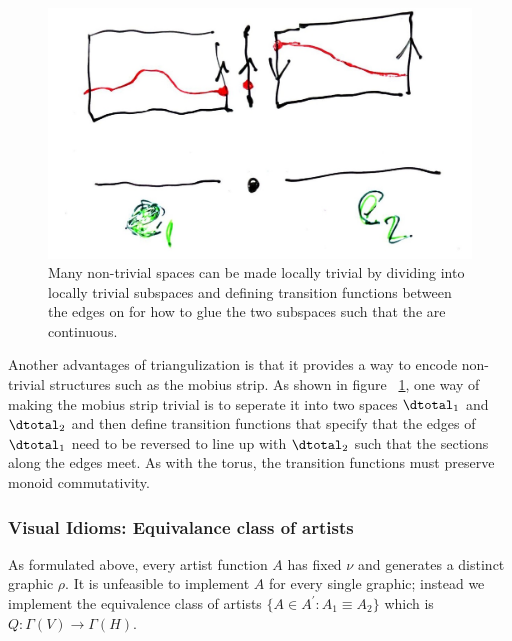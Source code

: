 \documentclass[../main.tex]{subfiles}
\begin{document}
\begin{figure}[H]
    \includegraphics[width=\textwidth]{figures/math/transition_functions.png}
    \caption{Many non-trivial spaces can be made locally trivial by dividing \dtotal into locally trivial subspaces and defining transition functions between the edges on \dbase for how to glue the two subspaces such that the \dsection are continuous.}
    \label{fig:data_base_transition}
\end{figure}
Another advantages of triangulization is that it provides a way to encode non-trivial structures such as the mobius strip\cite{MobiusStripNLab}. As shown in figure ~\ref{fig:data_base_transition}, one way of making the mobius strip trivial is to seperate it into two spaces $\dtotal_1$ and $\dtotal_2$ and then define transition functions that specify that the edges of $\dtotal_1$ need to be reversed to line up with $\dtotal_2$ such that the sections along the edges meet. As with the torus, the transition functions must preserve monoid commutativity. 

\subsubsection{Visual Idioms: Equivalance class of artists}
As formulated above, every artist function $A$ has fixed $\nu$ and generates a distinct graphic $\rho$. It is unfeasible to implement $A$ for every single graphic; instead we implement the equivalence class of artists $\{A \in A^\prime: A_{1} \equiv A_{2}\}$ which is $Q:\Gamma(V) \rightarrow \Gamma(H)$. 

\end{document}
